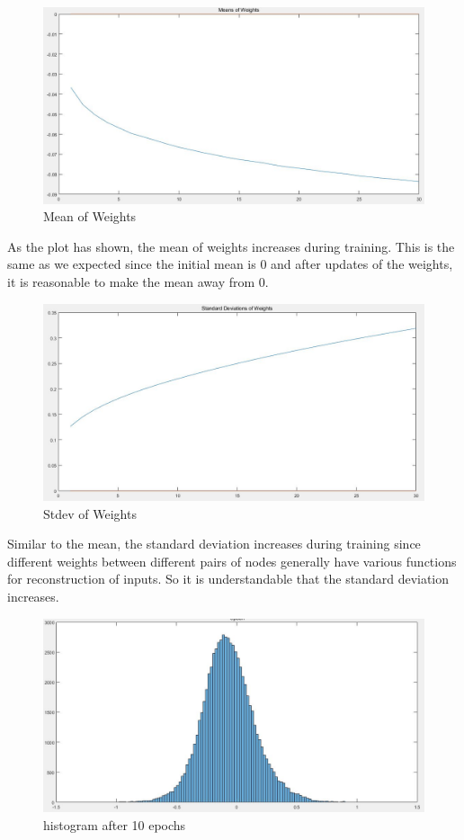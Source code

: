 \documentclass{article}
\begin{document}
\begin{figure}[H]
 \centering
 \includegraphics[width=1.2\textwidth]{MeanofWeights}
 \caption{Mean of Weights}\label{}
 \end{figure}
As the plot has shown, the mean of weights increases during training. This is the same as we expected since the initial mean is 0 and after updates of the weights, it is reasonable to make the mean away from 0.
 \begin{figure}[H]
 \centering
 \includegraphics[width=1.2\textwidth]{StdevofWeights}
 \caption{Stdev of Weights}\label{}
 \end{figure}
Similar to the mean, the standard deviation increases during training since different weights between different pairs of nodes generally have various functions for reconstruction of inputs. So it is understandable that the standard deviation increases.
 \begin{figure}[H]
 \centering
 \includegraphics[width=1.2\textwidth]{hist1.jpg}
 \caption{histogram after 10 epochs}\label{}
 \end{figure}
\end{document}
